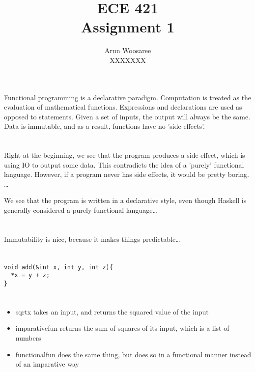 \documentclass[letterpaper]{article}
\title{ECE 421 \\
Assignment 1}
\author{Arun Woosaree\\
XXXXXXX
}
\begin{document}
\maketitle %

\section{}
Functional programming is a declarative paradigm.
Computation is treated as the evaluation of mathematical functions.
Expressions and declarations are used as opposed to statements.
Given a set of inputs, the output will always be the same.
Data is immutable, and as a result,
functions have no 'side-effects'.

\section{}

Right at the beginning, we see that the program produces a side-effect, which
is using IO to output some data. This contradicts the idea of a 'purely'
functional language. However, if a program never has side effects, it would be
pretty boring. \dots {}

We see that the program is written in a declarative style, even though Haskell
is generally considered a purely functional language\dots


\section{}
Immutability is nice, because it makes things predictable\dots

\section{}
\begin{verbatim}
void add(&int x, int y, int z){
  *x = y + z;
}
\end{verbatim}


\section{}

\subsection{}
\begin{itemize}
  \item sqrtx takes an input, and returns the squared value of the input
  \item imparativefun returns the sum of squares of its input, which is a list of numbers
  \item functionalfun does the same thing, but does so in a functional manner instead of an imparative way
\end{itemize}
\end{document}

